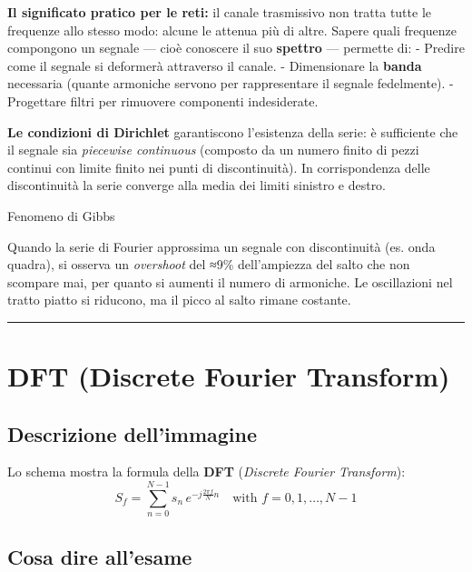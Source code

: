 \documentclass[
  italian,
  openany]{book}
\begin{document}
\textbf{Il significato pratico per le reti:} il canale trasmissivo non
tratta tutte le frequenze allo stesso modo: alcune le attenua più di
altre. Sapere quali frequenze compongono un segnale --- cioè conoscere
il suo \textbf{spettro} --- permette di: - Predire come il segnale si
deformerà attraverso il canale. - Dimensionare la \textbf{banda}
necessaria (quante armoniche servono per rappresentare il segnale
fedelmente). - Progettare filtri per rimuovere componenti indesiderate.

\textbf{Le condizioni di Dirichlet} garantiscono l'esistenza della
serie: è sufficiente che il segnale sia \emph{piecewise continuous}
(composto da un numero finito di pezzi continui con limite finito nei
punti di discontinuità). In corrispondenza delle discontinuità la serie
converge alla media dei limiti sinistro e destro.

\begin{calloutwarning}{Fenomeno di Gibbs}

Quando la serie di Fourier approssima un segnale con discontinuità (es.
onda quadra), si osserva un \emph{overshoot} del ≈9\% dell'ampiezza del
salto che non scompare mai, per quanto si aumenti il numero di
armoniche. Le oscillazioni nel tratto piatto si riducono, ma il picco al
salto rimane costante.

\end{calloutwarning}

\begin{center}\rule{0.5\linewidth}{0.5pt}\end{center}

\section{DFT (Discrete Fourier
Transform)}\label{dft-discrete-fourier-transform}

\subsection{Descrizione
dell'immagine}\label{descrizione-dellimmagine-14}

Lo schema mostra la formula della \textbf{DFT} (\emph{Discrete Fourier
Transform}):
\[S_f = \sum_{n=0}^{N-1} s_n \, e^{-j\frac{2\pi f}{N}n} \quad \text{with } f = 0, 1, \ldots, N-1\]

\subsection{Cosa dire all'esame}\label{cosa-dire-allesame-15}
\end{document}
